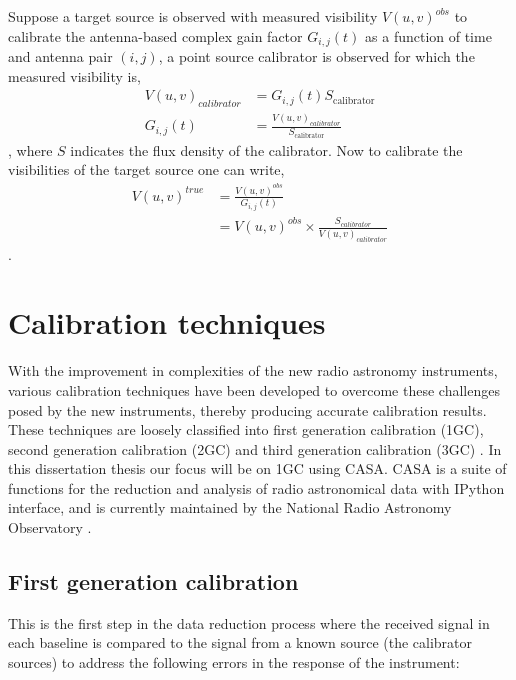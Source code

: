 Suppose a target source is observed with measured visibility $V(u,v)^{obs}$ to calibrate the antenna-based complex gain factor $G_{i,j}(t)$ as a function of time and antenna pair $(i,j)$, a point source calibrator is observed for which the measured visibility is, 
\begin{align} 
V(u,v)_{calibrator}&= G_{i,j}(t) S_{\mathrm{calibrator}}\\
G_{i,j}(t)&= \frac{V(u,v)_{calibrator}}{S_{\mathrm{calibrator}}}
\end{align}
\citep{thompson2001interferometry},
where $S$ indicates the flux density of the calibrator. Now to calibrate the visibilities of the target source one can write, 
\begin{align}
V(u,v)^{true}&= \frac{V(u,v)^{obs}}{G_{i,j}(t)}\\
&= V(u,v)^{obs} \times \frac{S_{calibrator}}{V(u,v)_{calibrator}} 
\end{align}
\citep{thompson2001interferometry}. 

\section{Calibration techniques}
\label{caltech}
With the improvement in complexities of the new radio astronomy instruments, various calibration techniques have been developed to overcome these challenges  posed by the new instruments, thereby producing accurate calibration results. These techniques are loosely classified into first generation calibration (1GC), second generation calibration (2GC) and third generation calibration (3GC) \citep{noordam2010meqtrees}. In this dissertation thesis our focus will be on 1GC using CASA. CASA is a suite of functions for the reduction and analysis of radio astronomical data with IPython interface, and is currently maintained by the National Radio Astronomy Observatory \citep{mcmullin2007casa}. 

\subsection{First generation calibration}

This is the first step in the data reduction process where the received signal in each baseline is compared to the signal from a known source (the calibrator sources) to address the following errors in the response of the instrument: 

